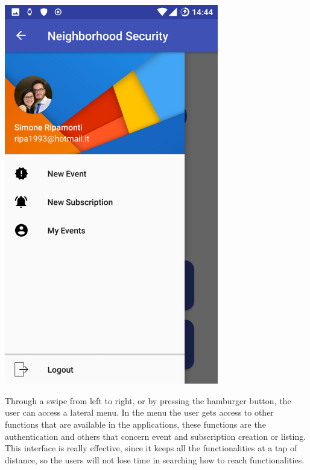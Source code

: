 \documentclass[a4paper]{scrreprt}
\begin{document}
\begin{minipage}{0.5\textwidth}
	\centering
	\includegraphics[width=0.7\textwidth]{imgs/home_drawer}
\end{minipage}
\begin{minipage}{0.5\textwidth}
	Through a swipe from left to right, or by pressing the hamburger button, the user can access a lateral menu. In the menu the user gets access to other functions that are available in the applications, these functions are the authentication and others that concern event and subscription creation or listing. This interface is really effective, since it keeps all the functionalities at a tap of distance, so the users will not lose time in searching how to reach functionalities.
\end{minipage}
\end{document}
